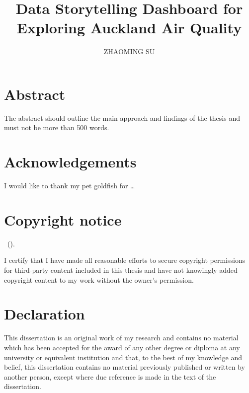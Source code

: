\documentclass{aucklandthesis}
\author{ZHAOMING SU}
\title{Data Storytelling Dashboard for Exploring Auckland Air Quality}
\begin{document}

\titlepage

{\rm\tighttoc\doublespacing}

\hypertarget{abstract}{%
\chapter*{Abstract}\label{abstract}}

The abstract should outline the main approach and findings of the thesis and must not be more than 500 words.

\newpage

\hypertarget{acknowledgements}{%
\chapter*{Acknowledgements}\label{acknowledgements}}

I would like to thank my pet goldfish for \dots

\hypertarget{copyright-notice}{%
\chapter*{Copyright notice}\label{copyright-notice}}

\textcopyright { } \authorname~(\number\the\year).

I certify that I have made all reasonable efforts to secure copyright permissions for third-party content included in this thesis and have not knowingly added copyright content to my work without the owner's permission.

\newpage

\hypertarget{declaration}{%
\chapter*{Declaration}\label{declaration}}

This dissertation is an original work of my research and contains no material which has been accepted for the award of any other degree or diploma at any university or equivalent institution and that, to the best of my knowledge and belief, this dissertation contains no material previously published or written by another person, except where due reference is made in the text of the dissertation.
\end{document}
